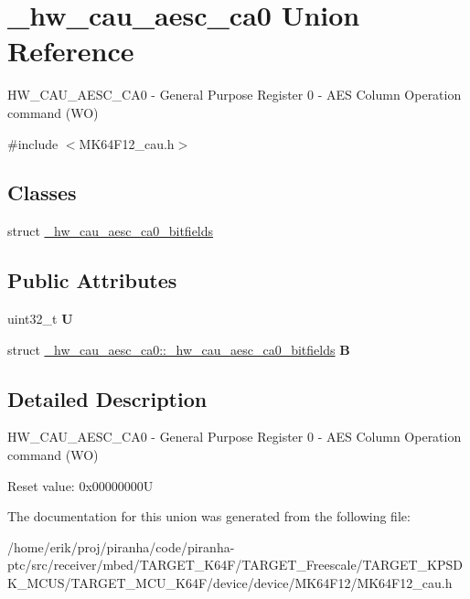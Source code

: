 \hypertarget{union__hw__cau__aesc__ca0}{}\section{\+\_\+hw\+\_\+cau\+\_\+aesc\+\_\+ca0 Union Reference}
\label{union__hw__cau__aesc__ca0}


H\+W\+\_\+\+C\+A\+U\+\_\+\+A\+E\+S\+C\+\_\+\+C\+A0 -\/ General Purpose Register 0 -\/ A\+ES Column Operation command (WO)  




{\ttfamily \#include $<$M\+K64\+F12\+\_\+cau.\+h$>$}

\subsection*{Classes}
\begin{DoxyCompactItemize}
\item 
struct \hyperlink{struct__hw__cau__aesc__ca0_1_1__hw__cau__aesc__ca0__bitfields}{\+\_\+hw\+\_\+cau\+\_\+aesc\+\_\+ca0\+\_\+bitfields}
\end{DoxyCompactItemize}
\subsection*{Public Attributes}
\begin{DoxyCompactItemize}
\item 
uint32\+\_\+t {\bfseries U}\hypertarget{union__hw__cau__aesc__ca0_a14ee67e4500febd7b39afd4c2df821ac}{}\label{union__hw__cau__aesc__ca0_a14ee67e4500febd7b39afd4c2df821ac}

\item 
struct \hyperlink{struct__hw__cau__aesc__ca0_1_1__hw__cau__aesc__ca0__bitfields}{\+\_\+hw\+\_\+cau\+\_\+aesc\+\_\+ca0\+::\+\_\+hw\+\_\+cau\+\_\+aesc\+\_\+ca0\+\_\+bitfields} {\bfseries B}\hypertarget{union__hw__cau__aesc__ca0_aab861263e4cdffc88586268abd9e1e54}{}\label{union__hw__cau__aesc__ca0_aab861263e4cdffc88586268abd9e1e54}

\end{DoxyCompactItemize}


\subsection{Detailed Description}
H\+W\+\_\+\+C\+A\+U\+\_\+\+A\+E\+S\+C\+\_\+\+C\+A0 -\/ General Purpose Register 0 -\/ A\+ES Column Operation command (WO) 

Reset value\+: 0x00000000U 

The documentation for this union was generated from the following file\+:\begin{DoxyCompactItemize}
\item 
/home/erik/proj/piranha/code/piranha-\/ptc/src/receiver/mbed/\+T\+A\+R\+G\+E\+T\+\_\+\+K64\+F/\+T\+A\+R\+G\+E\+T\+\_\+\+Freescale/\+T\+A\+R\+G\+E\+T\+\_\+\+K\+P\+S\+D\+K\+\_\+\+M\+C\+U\+S/\+T\+A\+R\+G\+E\+T\+\_\+\+M\+C\+U\+\_\+\+K64\+F/device/device/\+M\+K64\+F12/M\+K64\+F12\+\_\+cau.\+h\end{DoxyCompactItemize}
